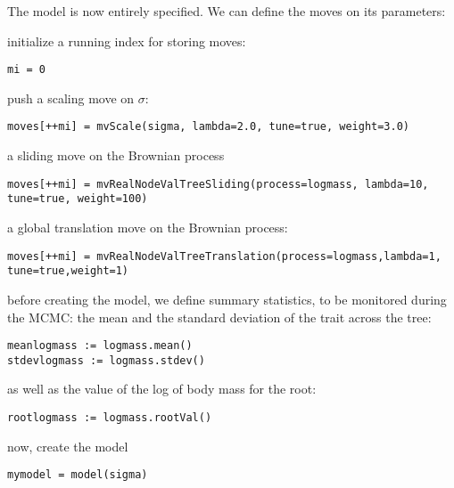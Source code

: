 The model is now entirely specified. We can define the moves on its parameters:

initialize a running index for storing moves:
{\tt \small \begin{snugshade*}
\begin{lstlisting}
mi = 0
\end{lstlisting}
\end{snugshade*}}

push a scaling move on $\sigma$:
{\tt \small \begin{snugshade*}
\begin{lstlisting}
moves[++mi] = mvScale(sigma, lambda=2.0, tune=true, weight=3.0)
\end{lstlisting}
\end{snugshade*}}

a sliding move on the Brownian process
{\tt \small \begin{snugshade*}
\begin{lstlisting}
moves[++mi] = mvRealNodeValTreeSliding(process=logmass, lambda=10, tune=true, weight=100)
\end{lstlisting}
\end{snugshade*}}

a global translation move on the Brownian process:
{\tt \small \begin{snugshade*}
\begin{lstlisting}
moves[++mi] = mvRealNodeValTreeTranslation(process=logmass,lambda=1, tune=true,weight=1)
\end{lstlisting}
\end{snugshade*}}

before creating the model, we define summary statistics, to be monitored during the MCMC: the mean and the standard deviation of the trait across the tree:
{\tt \small \begin{snugshade*}
\begin{lstlisting}
meanlogmass := logmass.mean()
stdevlogmass := logmass.stdev()
\end{lstlisting}
\end{snugshade*}}

as well as the value of the log of body mass for the root:
{\tt \small \begin{snugshade*}
\begin{lstlisting}
rootlogmass := logmass.rootVal()
\end{lstlisting}
\end{snugshade*}}

now, create the model
{\tt \small \begin{snugshade*}
\begin{lstlisting}
mymodel = model(sigma)
\end{lstlisting}
\end{snugshade*}}

